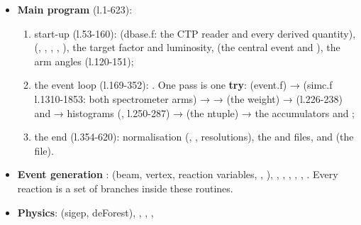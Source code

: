 \begin{itemize}
\item \textbf{Main program}  (l.1-623):

\begin{enumerate}
\item start-up (l.53-160):  (dbase.f: the CTP  reader and every derived quantity), 
(, , , , ), the target factor and luminosity,
 (the central event and ), the  arm angles (l.120-151);
\item the event loop (l.169-352): . One pass is one \textbf{try}:
 (event.f) →  (simc.f l.1310-1853: both spectrometer arms) →  →
 (the weight) →  (l.226-238) and  → histograms (, l.250-287) →
 (the ntuple) → the accumulators and ;
\item the end (l.354-620): normalisation (, , resolutions),\allowbreak{} the  and  files, and
 (the  file).
\end{enumerate}
\item \textbf{Event generation} :  (beam, vertex, reaction variables, , ),
, , , , , .
Every reaction is a set of  branches inside these routines.
\item \textbf{Physics}:  (sigep, deForest), , , ,

\end{itemize}
